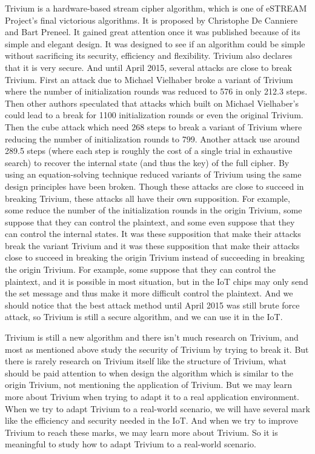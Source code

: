 \begin{bigabstract}
Trivium is a hardware-based stream cipher algorithm, which is one of eSTREAM Project's final victorious algorithms. It is proposed by Christophe De Canniere and Bart Preneel. It gained great attention once it was published because of its simple and elegant design. It was designed to see if an algorithm could be simple without sacrificing its security, efficiency and flexibility. Trivium also declares that it is very secure. And until April 2015, several attacks are close to break Trivium. First an attack due to Michael Vielhaber broke a variant of Trivium where the number of initialization rounds was reduced to 576 in only 212.3 steps. Then other authors speculated that attacks which built on Michael Vielhaber’s could lead to a break for 1100 initialization rounds or even the original Trivium. Then the cube attack which need 268 steps to break a variant of Trivium where reducing the number of initialization rounds to 799. Another attack use around 289.5 steps (where each step is roughly the cost of a single trial in exhaustive search) to recover the internal state (and thus the key) of the full cipher. By using an equation-solving technique reduced variants of Trivium using the same design principles have been broken. Though these attacks are close to succeed in breaking Trivium, these attacks all have their own supposition. For example, some reduce the number of the initialization rounds in the origin Trivium, some suppose that they can control the plaintext, and some even suppose that they can control the internal states. It was these supposition that make their attacks break the variant Trivium and it was these supposition that make their attacks close to succeed in breaking the origin Trivium instead of succeeding in breaking the origin Trivium. For example, some suppose that they can control the plaintext, and it is possible in most situation, but in the IoT chips may only send the set message and thus make it more difficult control the plaintext. And we should notice that the best attack method until April 2015 was still brute force attack, so Trivium is still a secure algorithm, and we can use it in the IoT.

Trivium is still a new algorithm and there isn’t much research on Trivium, and most as mentioned above study the security of Trivium by trying to break it. But there is rarely research on Trivium itself like the structure of Trivium, what should be paid attention to when design the algorithm which is similar to the origin Trivium, not mentioning the application of Trivium. But we may learn more about Trivium when trying to adapt it to a real application environment. When we try to adapt Trivium to a real-world scenario, we will have several mark like the efficiency and security needed in the IoT. And when we try to improve Trivium to reach these marks, we may learn more about Trivium. So it is meaningful to study how to adapt Trivium to a real-world scenario.


\end{bigabstract}
